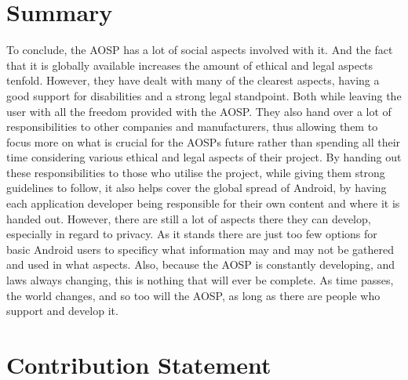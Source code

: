 \documentclass[conference]{IEEEtran}
\begin{document}
\section{Summary}
\label{summary}

To conclude, the AOSP has a lot of social aspects involved with it. And the fact that it is globally available increases the amount of ethical and legal aspects tenfold. However, they have dealt with many of the clearest aspects, having a good support for disabilities and a strong legal standpoint. Both while leaving the user with all the freedom provided with the AOSP. They also hand over a lot of responsibilities to other companies and manufacturers, thus allowing them to focus more on what is crucial for the AOSPs future rather than spending all their time considering various ethical and legal aspects of their project. By handing out these responsibilities to those who utilise the project, while giving them strong guidelines to follow, it also helps cover the global spread of Android, by having each application developer being responsible for their own content and where it is handed out. However, there are still a lot of aspects there they can develop, especially in regard to privacy. As it stands there are just too few options for basic Android users to specificy what information may and may not be gathered and used in what aspects. Also, because the AOSP is constantly developing, and laws always changing, this is nothing that will ever be complete. As time passes, the world changes, and so too will the AOSP, as long as there are people who support and develop it. 


\section{Contribution Statement}
\label{contribution}
\end{document}
